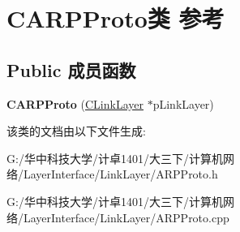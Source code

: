 \hypertarget{class_c_a_r_p_proto}{}\section{C\+A\+R\+P\+Proto类 参考}
\label{class_c_a_r_p_proto}
\subsection*{Public 成员函数}
\begin{DoxyCompactItemize}
\item 
\mbox{\label{class_c_a_r_p_proto_a4b69b4679fa1592faee457425921bbf4}} 
{\bfseries C\+A\+R\+P\+Proto} (\hyperlink{class_c_link_layer}{C\+Link\+Layer} $\ast$p\+Link\+Layer)
\end{DoxyCompactItemize}


该类的文档由以下文件生成\+:\begin{DoxyCompactItemize}
\item 
G\+:/华中科技大学/计卓1401/大三下/计算机网络/\+Layer\+Interface/\+Link\+Layer/A\+R\+P\+Proto.\+h\item 
G\+:/华中科技大学/计卓1401/大三下/计算机网络/\+Layer\+Interface/\+Link\+Layer/A\+R\+P\+Proto.\+cpp\end{DoxyCompactItemize}
